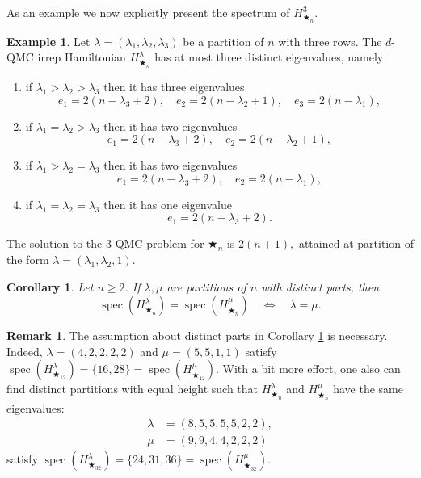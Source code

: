 \documentclass[12pt,dvipsnames,accepted=2016-08-18,a4paper,onecolumn]{quantumarticle}
\def\starn{{\bigstar_{n}}}
\DeclareMathOperator{\spec}{spec}
\numberwithin{equation}{section}
\newtheorem{corollary}[theorem]{Corollary}
\theoremstyle{definition}
\newtheorem{remark}[theorem]{Remark}
\newtheorem{example}[theorem]{Example}
\begin{document}
As an example we now explicitly present the spectrum of $H_\starn^{3}.$

\begin{example}\label{p:star3} Let $\lambda = (\lambda_1,\lambda_2,\lambda_3)$ be a partition of $n$ with three rows. The $d$-QMC irrep Hamiltonian $H_\starn^{\lambda}$ has at most three distinct eigenvalues, namely
\begin{enumerate}[\rm (1)]
\item if $\lambda_1>\lambda_2>\lambda_3$ then it has three eigenvalues
$$
e_1 = 2(n-\lambda_3+2), \quad e_2 =  2(n-\lambda_2+1), \quad e_3=2(n-\lambda_1),
$$
\item if $\lambda_1=\lambda_2>\lambda_3$ then it has two eigenvalues
$$
e_1 = 2 (n-\lambda_3+2), \quad e_2 = 2(n-\lambda_2+1),
$$
\item if $\lambda_1>\lambda_2=\lambda_3$ then it has two eigenvalues
$$
e_1 = 2 (n-\lambda_3+2), \quad e_2 = 2(n-\lambda_1),
$$
\item if $\lambda_1=\lambda_2=\lambda_3$ then it has one eigenvalue
$$
e_1 = 2 (n-\lambda_3+2).
$$
\end{enumerate}
The solution to the $3$-QMC problem for $\starn$ is $2(n+1),$ attained at partition of the form $\lambda=(\lambda_1,\lambda_2,1)$.
\end{example}




\begin{corollary}\label{c:dist}
Let $n\ge2$. If $\lambda,\mu$ are partitions of $n$ with distinct parts, then
$$\spec(H_{\starn}^\lambda)=\spec(H_{\starn}^\mu)
\quad\iff\quad\lambda=\mu.$$
\end{corollary}

\begin{remark}\label{r:dist}
The assumption about distinct parts in Corollary \ref{c:dist} is necessary. Indeed, $\lambda=(4,2,2,2,2)$ and $\mu=(5,5,1,1)$ satisfy
$\spec(H_{\bigstar_{12}}^\lambda)
=\{16,28\}=
\spec(H_{\bigstar_{12}}^\mu)$.
With a bit more effort, one also can find distinct partitions with equal height such that $H_{\starn}^\lambda$ and $H_{\starn}^\mu$ have the same eigenvalues:
\begin{align*}
\lambda&= (8,5,5,5,5,2,2),\\
\mu&= (9,9,4,4,2,2,2)
\end{align*}
satisfy $\spec(H_{\bigstar_{32}}^\lambda)
=\{24, 31, 36\}=
\spec(H_{\bigstar_{32}}^\mu)$.
\end{remark}
\end{document}
